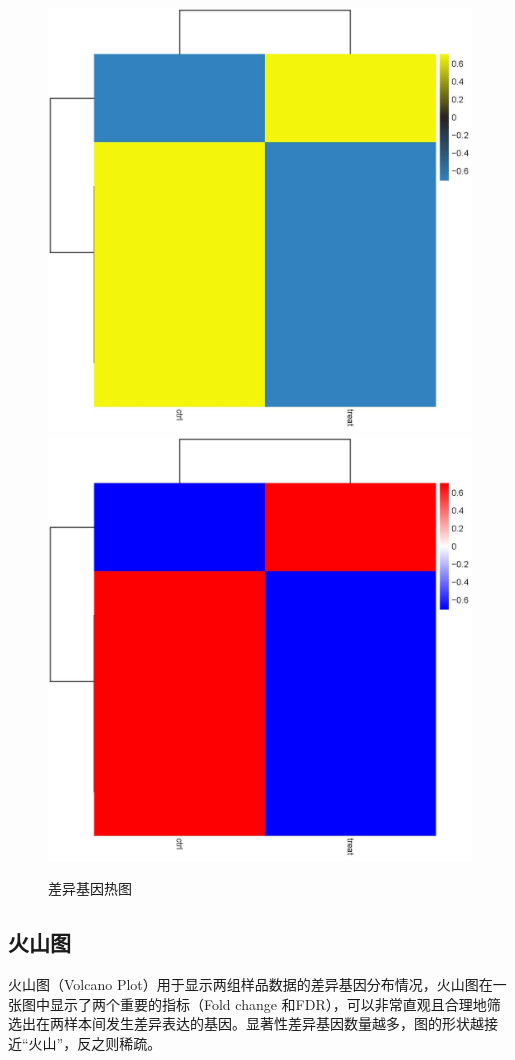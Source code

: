 \documentclass[
]{ctexart}
\begin{document}
\begin{figure}[H]

{\centering \includegraphics[width=0.48\linewidth]{./1.picture/hubRNA_heatmap_1} \includegraphics[width=0.48\linewidth]{./1.picture/hubRNA_heatmap_2} 

}

\caption{差异基因热图}\label{fig:unnamed-chunk-14}
\end{figure}

\hypertarget{ux706bux5c71ux56fe-1}{%
\subsection{火山图}\label{ux706bux5c71ux56fe-1}}

火山图（Volcano Plot）用于显示两组样品数据的差异基因分布情况，火山图在一张图中显示了两个重要的指标（Fold change 和FDR），可以非常直观且合理地筛选出在两样本间发生差异表达的基因。显著性差异基因数量越多，图的形状越接近``火山''，反之则稀疏。
\end{document}
